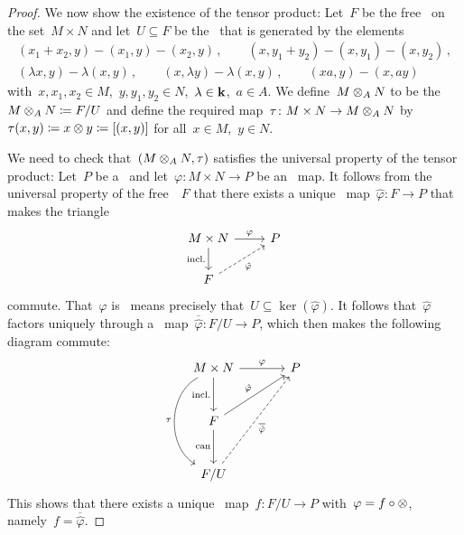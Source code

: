 \begin{proof}
  We now show the existence of the tensor product:
  Let~$F$ be the free~{\module{$\kf$}} on the set~$M \times N$ and let~$U \subseteq F$ be the~{\submodule{$\kf$}} that is generated by the elements
  \begin{gather*}
    (x_1 + x_2, y) - (x_1, y) - (x_2, y) \,,
    \qquad
    (x, y_1 + y_2) - (x, y_1) - (x, y_2) \,,
    \\
    (\lambda x, y) - \lambda (x,y) \,,
    \qquad
    (x, \lambda y) - \lambda (x,y) \,,
    \qquad
    (xa, y) - (x, ay)
  \end{gather*}
  with~$x, x_1, x_2 \in M$,~$y, y_1, y_2 \in N$,~$\lambda \in \mathbf{k}$,~$a \in A$.
  We define~$M \otimes_A N$ to be the~{\module{$\kf$}}~$M \otimes_A N \coloneqq F/U$ and define the required map~$\tau \colon M \times N \to M \otimes_A N$ by~$\tau(x,y) \coloneqq x \otimes y \coloneqq [(x,y)]$ for all~$x \in M$,~$y \in N$.
  
  We need to check that~$(M \otimes_A N, \tau)$ satisfies the universal property of the tensor product:
  Let~$P$ be a~{\module{$\kf$}} and let~$\varphi \colon M \times N \to P$ be an~{} map.
  It follows from the universal property of the free~{\module{$\kf$}}~$F$ that there exists a unique~{\klin} map~$\hat{\varphi} \colon F \to P$ that makes the triangle
  \[
    \begin{tikzcd}
        M \times N
        \arrow{r}[above]{\varphi}
        \arrow{d}[left]{\text{incl.}}
      & P
      \\
        F
        \arrow[dashed]{ur}[below right]{\hat{\varphi}}
      & {}
    \end{tikzcd}
  \]
  commute.
  That~$\varphi$ is~{} means precisely that~$U \subseteq \ker(\hat{\varphi})$.
  It follows that~$\hat{\varphi}$ factors uniquely through a~{\klin} map~$\overline{\hat{\varphi}} \colon F/U \to P$, which then makes the following diagram commute:
  \[
    \begin{tikzcd}[sep = large]
        M \times N
        \arrow{r}[above]{\varphi}
        \arrow{d}[left]{\text{incl.}}
        \arrow[bend right = 60]{dd}[left]{\tau}
      & P
      \\
        F
        \arrow{ur}[above left]{\hat{\varphi}}
        \arrow{d}[left]{\text{can}}
      & {}
      \\
        F/U
        \arrow[dashed]{uur}[below right]{\overline{\hat{\varphi}}}
      & {}
    \end{tikzcd}
  \]
  This shows that there exists a unique~{\klin} map~$f \colon F/U \to P$ with~$\varphi = f \circ \otimes$, namely~$f = \overline{\hat{\varphi}}$.
\end{proof}


